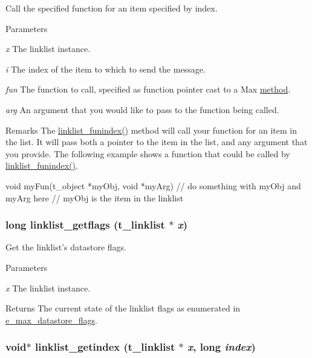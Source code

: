Call the specified function for an item specified by index. 
\begin{DoxyParams}{Parameters}
\item[{\em x}]The linklist instance. \item[{\em i}]The index of the item to which to send the message. \item[{\em fun}]The function to call, specified as function pointer cast to a Max \hyperlink{group__datatypes_gac26ba0a173b50597f5738132e059b42d}{method}. \item[{\em arg}]An argument that you would like to pass to the function being called.\end{DoxyParams}
\begin{DoxyRemark}{Remarks}
The \hyperlink{group__linklist_ga289838302ecbed343839de955cd8549c}{linklist\_\-funindex()} method will call your function for an item in the list. It will pass both a pointer to the item in the list, and any argument that you provide. The following example shows a function that could be called by \hyperlink{group__linklist_ga289838302ecbed343839de955cd8549c}{linklist\_\-funindex()}. 
\begin{DoxyCode}
    void myFun(t_object *myObj, void *myArg)
    {
        // do something with myObj and myArg here
        // myObj is the item in the linklist
    }
\end{DoxyCode}
 
\end{DoxyRemark}
\hypertarget{group__linklist_gacbef4ef795d257b8686aa274049efa4a}{
\subsubsection[{linklist\_\-getflags}]{\setlength{\rightskip}{0pt plus 5cm}long linklist\_\-getflags ({\bf t\_\-linklist} $\ast$ {\em x})}}
\label{group__linklist_gacbef4ef795d257b8686aa274049efa4a}


Get the linklist's datastore flags. 
\begin{DoxyParams}{Parameters}
\item[{\em x}]The linklist instance. \end{DoxyParams}
\begin{DoxyReturn}{Returns}
The current state of the linklist flags as enumerated in \hyperlink{group__datastore_gaa858d4b3815076d79624c39d9ca59348}{e\_\-max\_\-datastore\_\-flags}. 
\end{DoxyReturn}
\hypertarget{group__linklist_ga4d64ccb54a70c0a2a9b3fb68e495d9f4}{
\subsubsection[{linklist\_\-getindex}]{\setlength{\rightskip}{0pt plus 5cm}void$\ast$ linklist\_\-getindex ({\bf t\_\-linklist} $\ast$ {\em x}, \/  long {\em index})}}
\label{group__linklist_ga4d64ccb54a70c0a2a9b3fb68e495d9f4}


